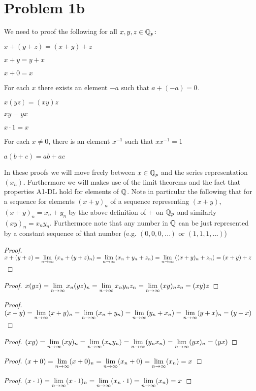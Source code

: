 \section*{Problem 1b}
We need to proof the following for all $x,y,z\in \mathbb{Q}_p$:\par
{} $x+(y+z) = (x+y)+z$
\par{} $x+y=y+x$
\par{} $x+0=x$
\par{} For each $x$ there exists an element $-a$ such that $a+(-a) = 0$.
\par{} $x(yz) = (xy)z$
\par{} $xy = yx$
\par{} $x\cdot 1 = x$
\par{} For each $x\neq 0$, there is an element $x^{-1}$ such that $xx^{-1}=1$
\par{} $a(b+c) = ab + ac$
\par In these proofs we will move freely between $x\in \mathbb{Q}_p$ and the series representation $(x_n)$. Furthermore we will makes use of the limit theorems and the fact that properties A1-DL hold for elements of $\mathbb{Q}$. Note in particular the following that for a sequence for elements $(x+y)_n$ of a sequence representing $(x+y)$, $(x+y)_n = x_n+y_n$ by the above definition of $+$ on $\mathbb{Q}_p$ and similarly $(xy)_n = x_ny_n$. Furthermore note that any number in $\mathbb{Q}$ can be just represented by a constant sequence of that number (e.g. $(0,0,0,\ldots)$ or $(1,1,1,\ldots)$)
\begin{proof}
$x+(y+z) = \lim\limits_{n\to\infty} \left(x_n + (y+z)_n\right) = \lim\limits_{n\to\infty} (x_n + y_n + z_n) =\lim\limits_{n\to\infty} \left((x+y)_n + z_n\right) = (x+y)+z$
\end{proof}
\begin{proof}
$x(yz) = \lim\limits_{n\to\infty} x_n(yz)_n = \lim\limits_{n\to\infty} x_ny_nz_n = \lim\limits_{n\to\infty} (xy)_nz_n = (xy)z$
\end{proof}
\begin{proof}
$(x+y) = \lim\limits_{n\to\infty} (x+y)_n = \lim\limits_{n\to\infty} (x_n + y_n) =  \lim\limits_{n\to\infty} (y_n + x_n) =  \lim\limits_{n\to\infty} (y+x)_n = (y+x)$
\end{proof}
\begin{proof}
$(xy) = \lim\limits_{n\to\infty} (xy)_n = \lim\limits_{n\to\infty} (x_ny_n) =  \lim\limits_{n\to\infty} (y_nx_n) =  \lim\limits_{n\to\infty} (yx)_n = (yx)$
\end{proof}
\begin{proof}
$(x+0) = \lim\limits_{n\to\infty} (x+0)_n = \lim\limits_{n\to\infty} (x_n+0) =  \lim\limits_{n\to\infty} (x_n) = x$
\end{proof}
\begin{proof}
$(x\cdot 1) = \lim\limits_{n\to\infty} (x\cdot 1)_n = \lim\limits_{n\to\infty} (x_n\cdot 1) =  \lim\limits_{n\to\infty} (x_n) = x$
\end{proof}
